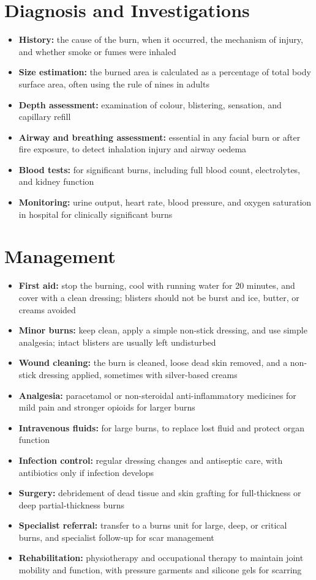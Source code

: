 \section*{Diagnosis and Investigations}
\begin{itemize}
    \item \textbf{History:} the cause of the burn, when it occurred, the mechanism of injury, and whether smoke or fumes were inhaled
    \item \textbf{Size estimation:} the burned area is calculated as a percentage of total body surface area, often using the rule of nines in adults
    \item \textbf{Depth assessment:} examination of colour, blistering, sensation, and capillary refill
    \item \textbf{Airway and breathing assessment:} essential in any facial burn or after fire exposure, to detect inhalation injury and airway oedema
    \item \textbf{Blood tests:} for significant burns, including full blood count, electrolytes, and kidney function
    \item \textbf{Monitoring:} urine output, heart rate, blood pressure, and oxygen saturation in hospital for clinically significant burns
\end{itemize}

\section*{Management}
\begin{itemize}
    \item \textbf{First aid:} stop the burning, cool with running water for 20 minutes, and cover with a clean dressing; blisters should not be burst and ice, butter, or creams avoided
    \item \textbf{Minor burns:} keep clean, apply a simple non-stick dressing, and use simple analgesia; intact blisters are usually left undisturbed
    \item \textbf{Wound cleaning:} the burn is cleaned, loose dead skin removed, and a non-stick dressing applied, sometimes with silver-based creams
    \item \textbf{Analgesia:} paracetamol or non-steroidal anti-inflammatory medicines for mild pain and stronger opioids for larger burns
    \item \textbf{Intravenous fluids:} for large burns, to replace lost fluid and protect organ function
    \item \textbf{Infection control:} regular dressing changes and antiseptic care, with antibiotics only if infection develops
    \item \textbf{Surgery:} debridement of dead tissue and skin grafting for full-thickness or deep partial-thickness burns
    \item \textbf{Specialist referral:} transfer to a burns unit for large, deep, or critical burns, and specialist follow-up for scar management
    \item \textbf{Rehabilitation:} physiotherapy and occupational therapy to maintain joint mobility and function, with pressure garments and silicone gels for scarring
\end{itemize}

